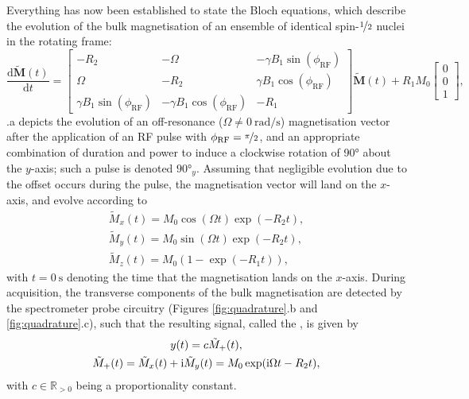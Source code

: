 Everything has now been established to state the Bloch equations, which
describe the evolution of the bulk magnetisation of an ensemble of identical
spin-$\nicefrac{1}{2}$ nuclei in the rotating frame:
\begin{equation}
    \frac{\mathrm{d}\tilde{\symbf{M}}(t)}{\mathrm{d}t} =
    \begin{bmatrix}
        -R_2 & -\Omega & -\gamma B_1 \sin(\phi_{\text{RF}}) \\
        \Omega & -R_2 & \gamma B_1 \cos(\phi_{\text{RF}}) \\
        \gamma B_1 \sin(\phi_{\text{RF}}) & -\gamma B_1 \cos(\phi_{\text{RF}}) & -R_1
    \end{bmatrix}
    \tilde{\symbf{M}}(t)
    + R_1 M_0
    \begin{bmatrix}
        0 \\ 0 \\ 1
    \end{bmatrix},
\end{equation}
.a depicts the
evolution of an off-resonance ($\Omega \neq \qty{0}{\radian\per\second}$)
magnetisation vector after the application of an
\ac{RF} pulse with $\phi_{\text{RF}} = \nicefrac{\pi}{2}$, and an appropriate
combination of duration and power to induce a clockwise rotation of \ang{90}
about the $y$-axis; such a pulse is denoted $\ang{90}_{y}$.
Assuming that negligible evolution due to the offset occurs during the pulse,
the magnetisation vector will land on the $x$-axis, and evolve according to
\begin{subequations}
    \begin{gather}
        \tilde{M}_x(t) = M_0 \cos(\Omega t) \exp(-R_2 t),\\
        \tilde{M}_y(t) = M_0 \sin(\Omega t) \exp(-R_2 t),\\
        \tilde{M}_z(t) = M_0 (1 - \exp(-R_1 t)),
    \end{gather}
\end{subequations}
with $t=\qty{0}{\second}$ denoting the time that the magnetisation lands on the
$x$-axis.
During acquisition, the transverse components of the bulk magnetisation are
detected by the spectrometer probe circuitry
(Figures \ref{fig:quadrature}.b and \ref{fig:quadrature}.c), such that the
resulting signal, called the , is given by
\begin{subequations}
    \begin{gather}
        y(t) = c \tilde{M}_+(t),\\
        \tilde{M}_+(t) = \tilde{M}_x (t) + \mathrm{i} \tilde{M}_y (t) = M_0 \exp(\mathrm{i} \Omega t - R_2 t),
    \end{gather}
\end{subequations}
with $c \in \mathbb{R}_{>0}$ being a proportionality constant.


